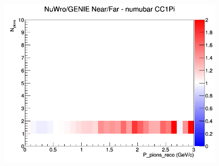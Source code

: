 \documentclass[12pt]{article}
\begin{document}
\begin{figure}[h]
\endminipage
{}
\includegraphics[width=\linewidth]{eff_N_P/FGT/pions/ratios/CC1Pi_NuWro_GENIE_numubar_NF_N_P.png}
\endminipage
\newline
\end{figure}
\clearpage
\end{document}
